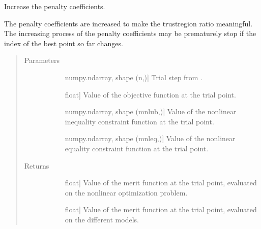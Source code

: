\documentclass[letterpaper,10pt,english]{sphinxmanual}
\begin{document}
\begin{fulllineitems}
\begin{fulllineitems}
\label{\detokenize{refs/generated/cobyqa.optimize.TrustRegion.update_penalty_coefficients:cobyqa.optimize.TrustRegion.update_penalty_coefficients}}
\sphinxAtStartPar
Increase the penalty coefficients.

\sphinxAtStartPar
The penalty coefficients are increased to make the trust\sphinxhyphen{}region ratio
meaningful. The increasing process of the penalty coefficients may be
prematurely stop if the index of the best point so far changes.
\begin{quote}\begin{description}
\item[{Parameters}] \leavevmode\begin{description}
\item[{}] \leavevmode{[}numpy.ndarray, shape (n,){]}
\sphinxAtStartPar
Trial step from .

\item[{}] \leavevmode{[}float{]}
\sphinxAtStartPar
Value of the objective function at the trial point.

\item[{}] \leavevmode{[}numpy.ndarray, shape (mnlub,){]}
\sphinxAtStartPar
Value of the nonlinear inequality constraint function at the trial
point.

\item[{}] \leavevmode{[}numpy.ndarray, shape (mnleq,){]}
\sphinxAtStartPar
Value of the nonlinear equality constraint function at the trial
point.

\end{description}

\item[{Returns}] \leavevmode\begin{description}
\item[{}] \leavevmode{[}float{]}
\sphinxAtStartPar
Value of the merit function at the trial point, evaluated on the
nonlinear optimization problem.

\item[{}] \leavevmode{[}float{]}
\sphinxAtStartPar
Value of the merit function at the trial point, evaluated on the
different models.


\end{description}
\end{description}
\end{quote}
\end{fulllineitems}
\end{fulllineitems}
\end{document}
